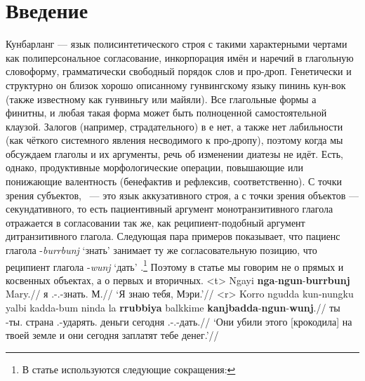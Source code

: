 \section{Введение}
\label{sec:intro}
Кунбарланг --- язык полисинтетического строя с такими характерными чертами как полиперсональное согласование, инкорпорация имён и наречий в глагольную словоформу, грамматически свободный порядок слов и про-дроп. Генетически и структурно он близок хорошо описанному гунвингскому языку пининь кун-вок (также известному как гунвиньгу или майяли\autocite{bgw}). Все глагольные формы  а финитны, и любая такая форма может быть полноценной самостоятельной клаузой. Залогов (например, страдательного) в  е нет, а также нет лабильности (как чёткого системного явления несводимого к про-дропу), поэтому когда мы обсуждаем глаголы и их аргументы, речь об изменении диатезы не идёт. Есть, однако, продуктивные морфологические операции, повышающие или понижающие валентность (бенефактив и рефлексив, соответственно). С точки зрения субъектов, \ --- это язык аккузативного строя, а с точки зрения объектов --- секундативного, то есть пациентивный аргумент монотранзитивного глагола отражается в согласовании так же, как реципиент-подобный аргумент дитранзитивного глагола.\autocite{haspelmath05} 
Следующая пара примеров показывает, что пациенс глагола -\textit{burrbunj} `знать'  %
занимает ту же согласовательную позицию, что реципиент глагола -\textit{wunj} `дать' .\footnote{В статье используются следующие сокращения:
\printglossary[style=inline,type=\leipzigtype]} Поэтому в статье мы говорим не о прямых и косвенных объектах, а о первых и вторичных.
\a<t>\begingl
\gla Ngayi \textbf{nga}-\textbf{ngun}-\textbf{burrbunj} Mary.//
\glb я \Fsg.\Real-\Ssg.\Obj-знать.\Np{} М.//
\glft `Я знаю тебя, Мэри.'//%
\endgl\a<r>\begingl
\gla Korro ngudda kun-nungku yalbi kadda-bum ninda la \textbf{rrubbiya} balkkime \textbf{kanjbadda}-\textbf{ngun}-\textbf{wunj}.//
\glb \korro{} ты \Cliv-ты.\Gen{} страна \Tpl.\Real-ударять.\Pst{} \ninda{} \la{} деньги сегодня \Tpl.\Fut-\Ssg.\Obj-дать.\Np{}//
\glft `Они убили этого [крокодила] на твоей земле и они сегодня заплатят тебе денег.'//%
\endgl\xe

